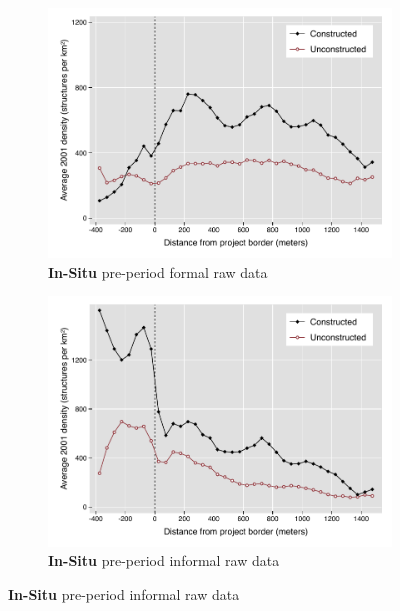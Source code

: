 \documentclass[12pt]{article}
\begin{document}
\begin{figure}
\begin{subfigure}[b]{0.48\textwidth}
        \end{subfigure}
        \begin{subfigure}[b]{0.48\textwidth}
                    \caption[Network2]%
            {{\footnotesize \textbf{In-Situ} pre-period formal  raw data}}   
            \label{fig:prefor}
            \centering
            \includegraphics[width=\textwidth,trim={0.3cm .3cm 0.1cm 0cm}, clip=true]{figures/bblu_for_pre_means_4_2_30k.pdf}

        \end{subfigure}
        \hfill
        \begin{subfigure}[b]{0.48\textwidth}  
                    \caption[]%
            {{\footnotesize \textbf{In-Situ} pre-period informal  raw data}}     
            \label{fig:preinf}
            \centering 
            \includegraphics[width=\textwidth,trim={0.3cm .3cm 0.1cm 0cm}, clip=true]{figures/bblu_inf_pre_means_4_2_30k.pdf}


\end{subfigure}
\end{figure}
\end{document}
